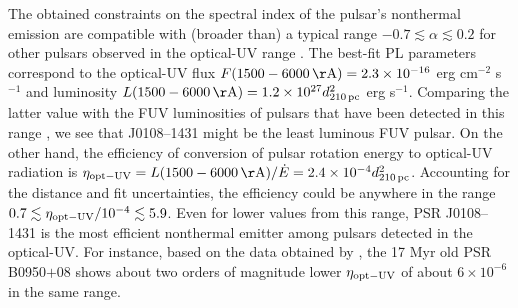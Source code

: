\documentclass[pdftex,twocolumn]{aastex62}
\newcommand{\yus}[1]{{\color[rgb]{0.5,0.1,0.5}YS: #1}}
\newcommand{\gp}[1]{{\color{blue} #1}}
\begin{document}
 The obtained constraints on the spectral index of the pulsar's nonthermal emission  are compatible with (broader than) 
 a typical range
 $-0.7\lesssim \alpha\lesssim 0.2$
 for other pulsars observed in the optical-UV range \citep[e.g.,][]{2011mignani,2019mignani}.  
The best-fit PL parameters correspond to the optical-UV flux 
 $F({\rm 1500-6000\,\AA}) = 2.3\times 10^{-16}$ erg cm$^{-2}$ s$^{-1}$ and luminosity 
 $L({\rm 1500-6000\,\AA}) = 1.2\times 10^{27} d_{\rm 210\,pc}^2$ erg s$^{-1}$. Comparing the latter value with  the FUV luminosities 
 of pulsars 
 that have been detected 
 in this range  \citep{2019mignani},
 we see that J0108--1431 might be  the least luminous FUV pulsar.  
 On the other hand, the efficiency of 
 conversion of pulsar rotation energy to optical-UV radiation is $\eta_{\rm opt-UV} = L({\rm 1500-6000\,\AA})/\dot{E} = 2.4\times 10^{-4} d_{\rm 210\,pc}^2$. 
 Accounting for the distance and fit uncertainties,
 the efficiency could be anywhere in the range
 $0.7\lesssim \eta_{\rm opt-UV}/10^{-4} \lesssim 5.9$.
 Even for lower values from this range, 
 PSR J0108--1431 is the most efficient nonthermal   emitter  
 among 
 pulsars %
  detected in the optical-UV. 
  For instance, based on the data obtained by \citet{Pavlov2017}, the 17 Myr old  PSR B0950$+$08 shows  about two orders of magnitude 
  lower $\eta_{\rm opt-UV}$  of about  %
  $6\times 10^{-6}$ in the same range.
\end{document}
